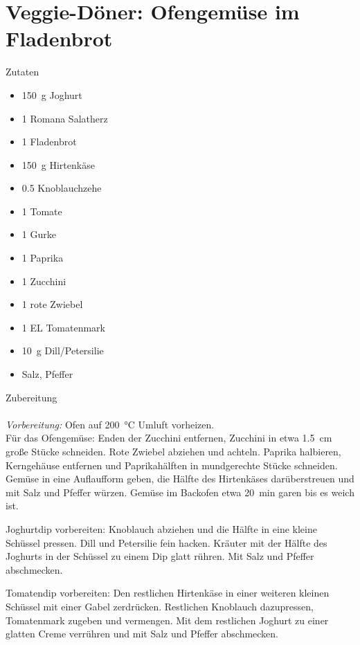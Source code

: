 \section*{Veggie-Döner: Ofengemüse im Fladenbrot}
\ihead{}\ohead{}
\cfoot{}
{\Large Zutaten}
\begin{multicols}{2}
\begin{itemize}
    \item \SI{150}{g} Joghurt
    \item \num{1} Romana Salatherz
    \item \num{1} Fladenbrot
    \item \SI{150}{g} Hirtenkäse
    \item \num{0.5} Knoblauchzehe
    \item \num{1} Tomate
    \item \num{1} Gurke
    \item \num{1} Paprika
    \item \num{1} Zucchini
    \item \num{1} rote Zwiebel
    \item \num{1} EL Tomatenmark
    \item \SI{10}{g} Dill/Petersilie
    \item Salz, Pfeffer
\end{itemize}
\end{multicols}
\noindent
{\Large Zubereitung}\\
\\
\textit{Vorbereitung:} Ofen auf \SI{200}{\celsius} Umluft vorheizen.\\
Für das Ofengemüse: Enden der Zucchini entfernen, Zucchini in etwa \SI{1.5}{cm} große Stücke schneiden.
Rote Zwiebel abziehen und achteln.
Paprika halbieren, Kerngehäuse entfernen und Paprikahälften in mundgerechte Stücke schneiden.
Gemüse in eine Auflaufform geben, die Hälfte des Hirtenkäses darüberstreuen und mit Salz und Pfeffer würzen. 
Gemüse im Backofen etwa \SI{20}{min} garen bis es weich ist.

Joghurtdip vorbereiten: Knoblauch abziehen und die Hälfte in eine kleine Schüssel pressen.
Dill und Petersilie fein hacken.
Kräuter mit der Hälfte des Joghurts in der Schüssel zu einem Dip glatt rühren. 
Mit Salz und Pfeffer abschmecken.

Tomatendip vorbereiten: Den restlichen Hirtenkäse in einer weiteren kleinen Schüssel mit einer Gabel zerdrücken. 
Restlichen Knoblauch dazupressen, Tomatenmark zugeben und vermengen. 
Mit dem restlichen Joghurt zu einer glatten Creme verrühren und mit Salz und Pfeffer abschmecken. 

